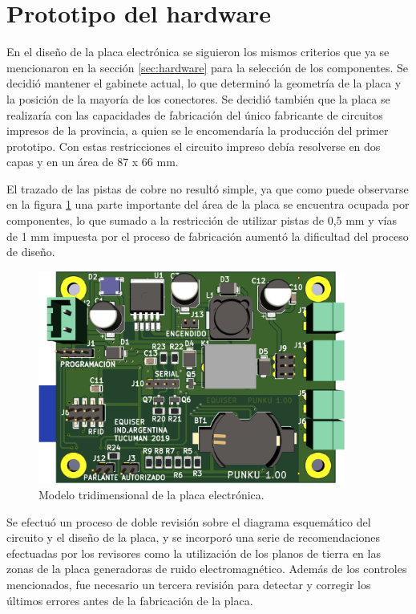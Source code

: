 \section{Prototipo del hardware}
\label{sec:prototipo}

En el diseño de la placa electrónica se siguieron los mismos criterios que ya se mencionaron en la sección \ref{sec:hardware} para la selección de los componentes. Se decidió mantener el gabinete actual, lo que determinó la geometría de la placa y la posición de la mayoría de los conectores. Se decidió también que la placa se realizaría con las capacidades de fabricación del único fabricante de circuitos impresos de la provincia, a quien se le encomendaría la producción del primer prototipo. Con estas restricciones el circuito impreso debía resolverse en dos capas y en un área de 87 x 66 mm. 

El trazado de las pistas de cobre no resultó simple, ya que como puede observarse en la figura \ref{fig:Componentes} una parte importante del área de la placa se encuentra ocupada por componentes, lo que sumado a la restricción de utilizar pistas de 0,5 mm y vías de 1 mm impuesta por el proceso de fabricación aumentó la dificultad del proceso de diseño. 

\begin{figure}[ht]
	\centering
	\includegraphics[width=0.9\textwidth]{Figures/ModeloPlaca.png}
	\caption[Modelo tridimensional de la placa electrónica]{Modelo tridimensional de la placa electrónica.}
	\label{fig:Componentes}
\end{figure}

Se efectuó un proceso de doble revisión sobre el diagrama esquemático del circuito y el diseño de la placa, y se incorporó una serie de recomendaciones efectuadas por los revisores como la utilización de los planos de tierra en las zonas de la placa generadoras de ruido electromagnético. Además de los controles mencionados, fue necesario un tercera revisión para detectar y corregir los últimos errores antes de la fabricación de la placa.

